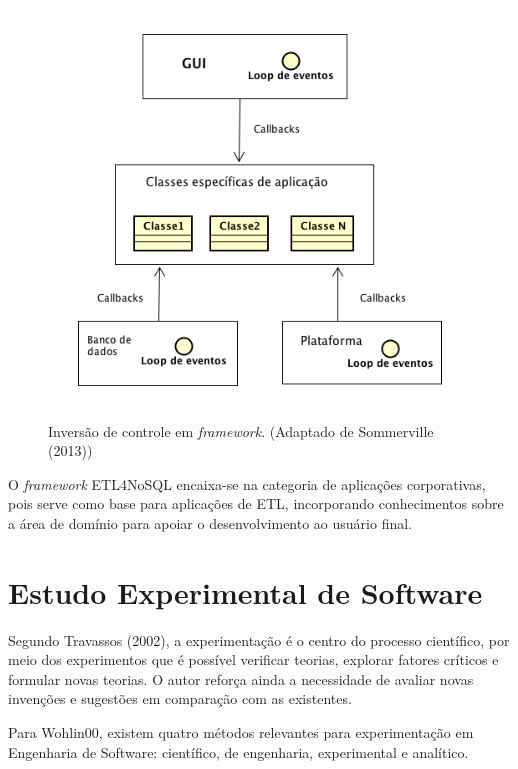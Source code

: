 \begin{figure}[h!]
	\centering
	\includegraphics[scale=0.5]{fig/inversaodecontrole.png}
	\caption{Inversão de controle em \textit{framework}. (Adaptado de Sommerville (2013))}
	\label{inversaodecontrole}
\end{figure}

O \textit{framework} ETL4NoSQL encaixa-se na categoria de aplicações corporativas, pois serve como base para aplicações de ETL, incorporando conhecimentos sobre a área de domínio para apoiar o desenvolvimento ao usuário final.




\section{Estudo Experimental de Software}

Segundo Travassos (2002), a experimentação é o centro do processo científico, por meio dos experimentos que é possível verificar teorias, explorar fatores críticos e formular novas teorias. O autor reforça ainda a necessidade de avaliar novas invenções e sugestões em comparação com as existentes.

Para Wohlin00, existem quatro métodos relevantes para experimentação em Engenharia de Software: científico, de engenharia, experimental e analítico. 

